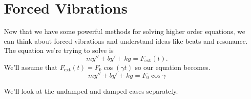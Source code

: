 \section{Forced Vibrations}
\noindent
Now that we have some powerful methods for solving higher order equations, we can think about forced vibrations and understand ideas like beats and resonance.\\

\noindent
The equation we're trying to solve is
\begin{equation*}
	my'' + by' + ky = F_{\text{ext}}(t).
\end{equation*}
We'll assume that $F_{\text{ext}}(t) = F_0\cos{(\gamma t)}$ so our equation becomes.
\begin{equation*}
	my'' + by' + ky = F_0\cos{\gamma}
\end{equation*}

\noindent
We'll look at the undamped and damped cases separately.


